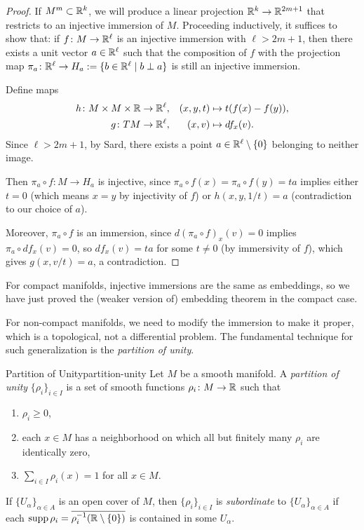 \begin{proof}
    If $M^m \subset \mathbb{R}^k$, we will produce a linear projection $\mathbb{R}^k \to \mathbb{R}^{2m+1}$ that restricts to an injective immersion of $M$. Proceeding inductively, it suffices to show that: if $f \colon M \to \mathbb{R}^\ell$ is an injective immersion with $\ell > 2m + 1$, then there exists a unit vector $a \in \mathbb{R}^\ell$ such that the composition of $f$ with the projection map $\pi_a \colon \mathbb{R}^\ell \to H_a := \{b \in \mathbb{R}^\ell \mid b \perp a\}$ is still an injective immersion.

    Define maps
    \begin{align*}
        h \colon M \times M \times \mathbb{R} &\to \mathbb{R}^\ell, & (x, y, t) &\mapsto t(f(x) - f(y)), \\
        g \colon TM &\to \mathbb{R}^\ell, & (x, v) &\mapsto df_x(v).
    \end{align*}
    Since $\ell > 2m + 1$, by Sard, there exists a point $a \in \mathbb{R}^\ell \setminus \{0\}$ belonging to neither image.

    Then $\pi_a \circ f \colon M \to H_a$ is injective, since $\pi_a \circ f(x) = \pi_a \circ f(y) = ta$ implies either $t = 0$ (which means $x = y$ by injectivity of $f$) or $h(x, y, 1/t) = a$ (contradiction to our choice of $a$).

    Moreover, $\pi_a \circ f$ is an immersion, since $d(\pi_a \circ f)_x(v) = 0$ implies $\pi_a \circ df_x(v) = 0$, so $df_x(v) = ta$ for some $t \neq 0$ (by immersivity of $f$), which gives $g(x, v/t) = a$, a contradiction.
\end{proof}

For compact manifolds, injective immersions are the same as embeddings, so we have just proved the (weaker version of) embedding theorem in the compact case.

For non-compact manifolds, we need to modify the immersion to make it proper, which is a topological, not a differential problem. The fundamental technique for such generalization is the \emph{partition of unity}.

\begin{definition}{Partition of Unity}{partition-unity}
    Let $M$ be a smooth manifold. A \emph{partition of unity} $\{\rho_i\}_{i \in I}$ is a set of smooth functions $\rho_i \colon M \to \mathbb{R}$ such that
    \begin{enumerate}[label=(\alph*)]
        \item $\rho_i \geq 0$,
        \item each $x \in M$ has a neighborhood on which all but finitely many $\rho_i$ are identically zero,
        \item $\sum_{i \in I} \rho_i(x) = 1$ for all $x \in M$.
    \end{enumerate}

    If $\{U_\alpha\}_{\alpha \in A}$ is an open cover of $M$, then $\{\rho_i\}_{i \in I}$ is \emph{subordinate} to $\{U_\alpha\}_{\alpha \in A}$ if each $\operatorname{supp} \rho_i = \overline{\rho_i^{-1}(\mathbb{R} \setminus \{0\})}$ is contained in some $U_\alpha$.
\end{definition}

